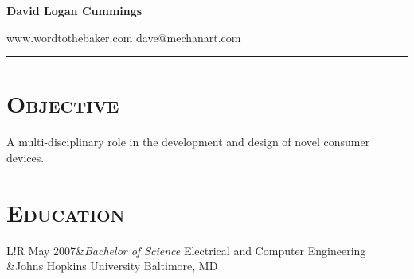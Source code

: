 \documentclass[10pt, letterpaper]{article}
\newcommand\VRule{\color{lightgray}\vrule width 0.5pt}
\begin{document}
\centerline{\large\bf David Logan Cummings}
www.wordtothebaker.com \hfill dave@mechanart.com
\vspace{1em}
\hrule height 1pt


\section*{\textsc{\textbf{Objective}}} A multi-disciplinary role in the development and design of novel
consumer devices. 


\section*{\textbf{\textsc{Education}}} 
\begin{tabular}{L!{\VRule}R}
  May 2007&{\sl Bachelor of Science}  \hfill Electrical and Computer Engineering \\
          &Johns Hopkins University  \hfill Baltimore, MD \\
\end{tabular}
\end{document}
